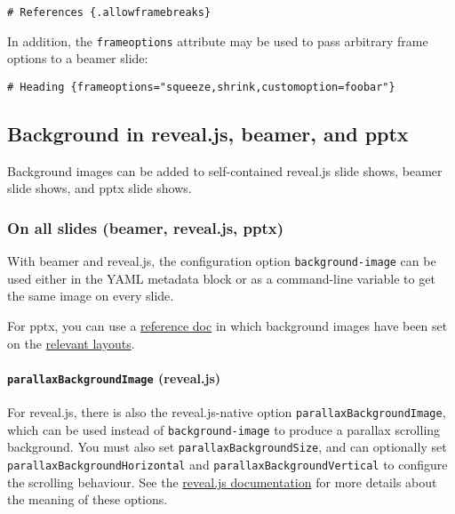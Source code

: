 \documentclass[
]{article}
\begin{document}
\begin{verbatim}
# References {.allowframebreaks}
\end{verbatim}

In addition, the \texttt{frameoptions} attribute may be used to pass
arbitrary frame options to a beamer slide:

\begin{verbatim}
# Heading {frameoptions="squeeze,shrink,customoption=foobar"}
\end{verbatim}

\hypertarget{background-in-reveal.js-beamer-and-pptx}{%
\subsection{Background in reveal.js, beamer, and
pptx}\label{background-in-reveal.js-beamer-and-pptx}}

Background images can be added to self-contained reveal.js slide shows,
beamer slide shows, and pptx slide shows.

\hypertarget{on-all-slides-beamer-reveal.js-pptx}{%
\subsubsection{On all slides (beamer, reveal.js,
pptx)}\label{on-all-slides-beamer-reveal.js-pptx}}

With beamer and reveal.js, the configuration option
\texttt{background-image} can be used either in the YAML metadata block
or as a command-line variable to get the same image on every slide.

For pptx, you can use a
\protect\hyperlink{option--reference-doc}{reference doc} in which
background images have been set on the
\protect\hyperlink{powerpoint-layout-choice}{relevant layouts}.

\hypertarget{parallaxbackgroundimage-reveal.js}{%
\paragraph{\texorpdfstring{\texttt{parallaxBackgroundImage}
(reveal.js)}{parallaxBackgroundImage (reveal.js)}}\label{parallaxbackgroundimage-reveal.js}}

For reveal.js, there is also the reveal.js-native option
\texttt{parallaxBackgroundImage}, which can be used instead of
\texttt{background-image} to produce a parallax scrolling background.
You must also set \texttt{parallaxBackgroundSize}, and can optionally
set \texttt{parallaxBackgroundHorizontal} and
\texttt{parallaxBackgroundVertical} to configure the scrolling
behaviour. See the
\href{https://revealjs.com/backgrounds/\#parallax-background}{reveal.js
documentation} for more details about the meaning of these options.
\end{document}
